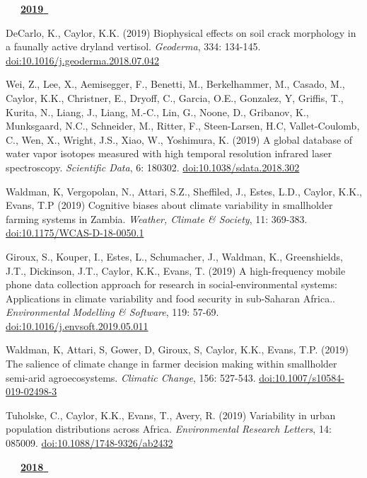 \begin{etaremune}
\mbox{\ \ \ \underline{\textbf{2019 }}}

\item DeCarlo, K., Caylor, K.K. (2019) Biophysical effects on soil crack morphology in a faunally active dryland vertisol. \emph{Geoderma}, 334: 134-145. \href{https://doi.org/10.1016/j.geoderma.2018.07.042}{doi:10.1016/j.geoderma.2018.07.042}
\item Wei, Z., Lee, X., Aemisegger, F., Benetti, M., Berkelhammer, M., Casado, M., Caylor, K.K., Christner, E., Dryoff, C., Garcia, O.E., Gonzalez, Y, Griffis, T., Kurita, N., Liang, J., Liang, M.-C., Lin, G., Noone, D., Gribanov, K., Munksgaard, N.C., Schneider, M., Ritter, F., Steen-Larsen, H.C, Vallet-Coulomb, C., Wen, X., Wright, J.S., Xiao, W., Yoshimura, K. (2019) A global database of water vapor isotopes measured with high temporal resolution infrared laser spectroscopy. \emph{Scientific Data}, 6: 180302. \href{https://doi.org/10.1038/sdata.2018.302}{doi:10.1038/sdata.2018.302}
\item Waldman, K, Vergopolan, N., Attari, S.Z., Sheffiled, J., Estes, L.D., Caylor, K.K., Evans, T.P (2019) Cognitive biases about climate variability in smallholder farming systems in Zambia. \emph{Weather, Climate \& Society}, 11: 369-383. \href{https://doi.org/10.1175/WCAS-D-18-0050.1}{doi:10.1175/WCAS-D-18-0050.1}
\item Giroux, S., Kouper, I., Estes, L., Schumacher, J., Waldman, K., Greenshields, J.T., Dickinson, J.T., Caylor, K.K., Evans, T. (2019) A high-frequency mobile phone data collection approach for research in social-environmental systems: Applications in climate variability and food security in sub-Saharan Africa.. \emph{Environmental Modelling \& Software}, 119: 57-69. \href{https://doi.org/10.1016/j.envsoft.2019.05.011}{doi:10.1016/j.envsoft.2019.05.011}
\item Waldman, K, Attari, S, Gower, D, Giroux, S, Caylor, K.K., Evans, T.P. (2019) The salience of climate change in farmer decision making within smallholder semi-arid agroecosystems. \emph{Climatic Change}, 156: 527-543. \href{https://doi.org/10.1007/s10584-019-02498-3}{doi:10.1007/s10584-019-02498-3}
\item Tuholske, C., Caylor, K.K., Evans, T., Avery, R. (2019) Variability in urban population distributions across Africa. \emph{Environmental Research Letters}, 14: 085009. \href{https://doi.org/10.1088/1748-9326/ab2432}{doi:10.1088/1748-9326/ab2432}

\mbox{\ \ \ \underline{\textbf{2018 }}}


\end{etaremune}
